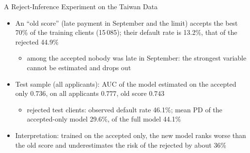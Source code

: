 \begin{frame}{A Reject-Inference Experiment on the Taiwan Data}
\itemsize{\footnotesize}
\begin{itemize}
    \item An ``old score'' (late payment in September and the limit) accepts the best 70\% of the training clients (15\,085); their default rate is 13.2\%, that of the rejected 44.9\%
    \begin{itemize}
        \item among the accepted nobody was late in September: the strongest variable cannot be estimated and drops out
    \end{itemize}
    \item Test sample (all applicants): AUC of the model estimated on the accepted only $0.736$, on all applicants $0.777$, old score $0.743$
    \begin{itemize}
        \item rejected test clients: observed default rate 46.1\%; mean PD of the accepted-only model 29.6\%, of the full model 44.1\%
    \end{itemize}
    \item Interpretation: trained on the accepted only, the new model ranks worse than the old score and underestimates the risk of the rejected by about 36\%
\end{itemize}
\end{frame}

